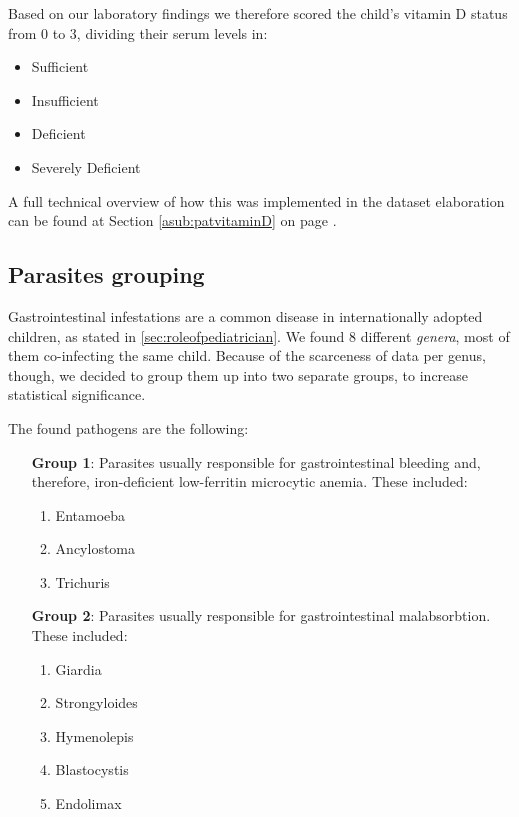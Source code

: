 Based on our laboratory findings we therefore scored the child's vitamin D status from 0 to 3, dividing their serum levels in:

\begin{itemize}
	\item Sufficient
	\item Insufficient
	\item Deficient
	\item Severely Deficient
\end{itemize}

A full technical overview of how this was implemented in the dataset elaboration can be found at Section \ref{asub:patvitaminD} on page \pageref{asub:patvitaminD}.

\subsection{Parasites grouping}\label{sub:parasites}
Gastrointestinal infestations are a common disease in internationally adopted children, as stated in \ref{sec:roleofpediatrician}. We found 8 different \textit{genera}, most of them co-infecting the same child. Because of the scarceness of data per genus, though, we decided to group them up into two separate groups, to increase statistical significance.

The found pathogens are the following:

\begin{enumerate}[leftmargin=6em]
	\item [\textbf{Group 1}:] Parasites usually responsible for gastrointestinal bleeding and, therefore, iron-deficient low-ferritin microcytic anemia. These included:
		\begin{enumerate}[label=\alph*)]
			\item Entamoeba
			\item Ancylostoma
			\item Trichuris
		\end{enumerate}
	\item [\textbf{Group 2}:] Parasites usually responsible for gastrointestinal malabsorbtion. These included:
		\begin{enumerate}[label=\alph*)]
			\item Giardia
			\item Strongyloides
			\item Hymenolepis
			\item Blastocystis
			\item Endolimax
		\end{enumerate}
\end{enumerate}

